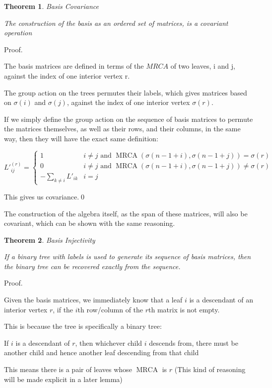 \documentclass[10pt,a4paper]{report}
\DeclareMathOperator{\MRCA}{MRCA}
\newtheorem{theorem}{Theorem}
\begin{document}
\begin{theorem} Basis Covariance

	The construction of the basis as an ordered set of matrices, is a covariant operation
\end{theorem}

Proof.

The basis matrices are defined in terms of the $MRCA$ of two leaves, i and j, against the index of one interior vertex r.

The group action on the trees permutes their labels, which gives matrices based on $\sigma(i)$ and $\sigma(j)$, against the index of one interior vertex $\sigma(r)$.

If we simply define the group action on the sequence of basis matrices to permute the matrices themselves, as well as their rows, and their columns, in the same way, then they will have the exact same definition:

\[ L\prime_{ij}^(r) = \begin{cases}
	1 & i \neq j \textrm{ and } \MRCA(\sigma(n-1+i), \sigma(n-1+j)) = \sigma(r)\\
	0 & i \neq j \textrm{ and } \MRCA(\sigma(n-1+i), \sigma(n-1+j)) \neq \sigma(r)\\
	-\sum_{k \neq i} L\prime_{ik} & i = j
\end{cases} \]

This gives us covariance.\qed

The construction of the algebra itself, as the span of these matrices, will also be covariant, which can be shown with the same reasoning.

\begin{theorem} Basis Injectivity

	If a binary tree with labels is used to generate its sequence of basis matrices, then the binary tree can be recovered exactly from the sequence.
\end{theorem}

Proof.

Given the basis matrices, we immediately know that a leaf $i$ is a descendant of an interior vertex $r$, if the $i$th row/column of the $r$th matrix is not empty.

This is because the tree is specifically a binary tree:

If $i$ is a descendant of $r$, then whichever child $i$ descends from, there must be another child and hence another leaf descending from that child

This means there is a pair of leaves whose $\MRCA$ is $r$ (This kind of reasoning will be made explicit in a later lemma)
\end{document}

